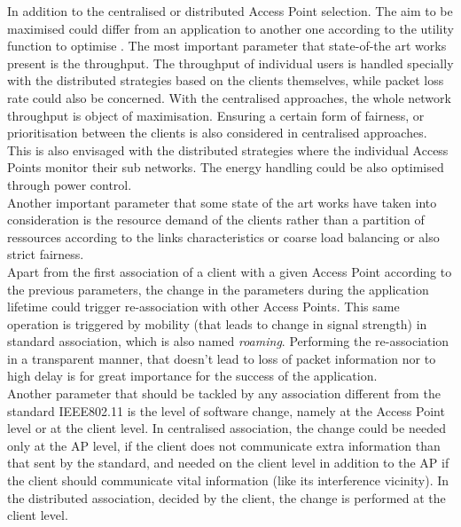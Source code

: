 \documentclass[journal,transmag]{IEEEtran}
\begin{document}
In addition to the centralised or distributed Access Point selection. The aim to be maximised could differ from an application to another one according to the utility function to optimise \cite{17QOS_AP_selection}. The most important parameter that state-of-the art works present is the throughput. The throughput of individual users is handled specially with the distributed strategies based on the clients themselves, while packet loss rate could also be concerned. With the centralised approaches, the whole network throughput is object of maximisation. Ensuring a certain form of fairness, or prioritisation between the clients is also considered in centralised approaches. This is also envisaged with the distributed strategies where the individual Access Points monitor their sub networks. The energy handling could be also optimised through power control.\\    
Another important parameter that some state of the art works have taken into consideration is the resource demand of the clients \cite{07optimal_association_MSWIM,16throughput_optimisation_association_bandwidth} rather than a partition of ressources according to the links characteristics or coarse load balancing or also strict fairness. \\
Apart from the first association of a client with a given Access Point according to the previous parameters, the change in the parameters during the application lifetime could trigger re-association with other Access Points. This same operation is triggered by mobility (that leads to change in signal strength) in standard association, which is also named \textit{roaming}. Performing the re-association in a transparent manner, that doesn't lead to loss of packet information nor to high delay is for great importance for the success of the application. \\
Another parameter that should be tackled by any association different from the standard IEEE802.11 is the level of software change, namely at the Access Point level or at the client level. In centralised association, the change could be needed only at the AP level, if the client does not communicate extra information than that sent by the standard, and needed on the client level in addition to the AP if the client should communicate vital information (like its interference vicinity). In the distributed association, decided by the client, the change is performed at the client level. 
\end{document}
